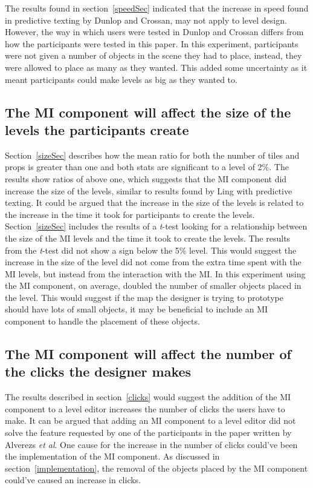 \documentclass[journal]{IEEEtran}
\begin{document}
The results found in section~\ref{speedSec} indicated that the increase in speed found in predictive texting by Dunlop and Crossan\cite{dunlop2000predictive}, may not apply to level design. However, the way in which users were tested in Dunlop and Crossan\cite{dunlop2000predictive} differs from how the participants were tested in this paper. In this experiment, participants were not given a number of objects in the scene they had to place, instead, they were allowed to place as many as they wanted. This added some uncertainty as it meant participants could make levels as big as they wanted to. 

\subsection{The MI component will affect the size of the levels the participants create}
Section~\ref{sizeSec} describes how the mean ratio for both the number of tiles and props is greater than one and both stats are significant to a level of 2\%.  The results show ratios of above one, which suggests that the MI component did increase the size of the levels, similar to results found by Ling \cite{ling2005length} with predictive texting. It could be argued that the increase in the size of the levels is related to the increase in the time it took for participants to create the levels. Section~\ref{sizeSec} includes the results of a \textit{t}-test looking for a relationship between the size of the MI levels and the time it took to create the levels. The results from the \textit{t}-test did not show a sign below the 5\% level. This would suggest the increase in the size of the level did not come from the extra time spent with the MI levels, but instead from the interaction with the MI. In this experiment using the MI component, on average, doubled the number of smaller objects placed in the level. This would suggest if the map the designer is trying to prototype should have lots of small objects, it may be beneficial to include an MI component to handle the placement of these objects. 

\subsection{The MI component will affect the number of the clicks the designer makes}
The results described in section~\ref{clicks} would suggest the addition of the MI component to a level editor increases the number of clicks the users have to make. It can be argued that adding an MI component to a level editor did not solve the feature requested by one of the participants in the paper written by Alverezs \textit{et al}\cite{alvarez2018fostering}. One cause for the increase in the number of clicks could've been the implementation of the MI component. As discussed in section~\ref{implementation}, the removal of the objects placed by the MI component could've caused an increase in clicks. 
\end{document}
